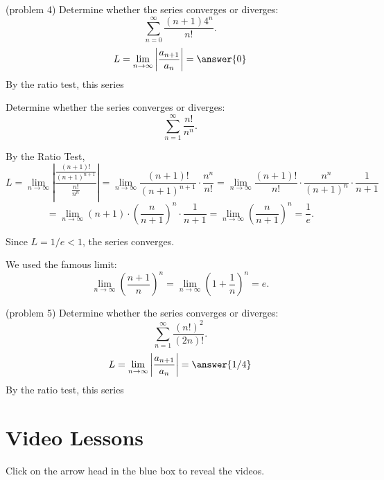 \documentclass[handout]{ximera}
\begin{document}
\begin{problem}(problem 4)
Determine whether the series converges or diverges:
\[
\sum_{n=0}^\infty \frac{(n+1)4^n}{n!}.
\]
\[
L = \lim_{n \to \infty} \left|\frac{a_{n+1}}{a_n}\right| = \answer{0}
\]
By the ratio test, this series 

\end{problem}






\begin{example}[example 5]
Determine whether the series converges or diverges:
\[
\sum_{n=1}^\infty \frac{n!}{n^n}.
\]


By the Ratio Test,
\[
L =  \lim_{n \to \infty} \left|\frac{\frac{(n+1)!}{(n+1)^{n+1}}}{\frac{n!}{n^n}}\right| = 
\lim_{n \to \infty} \frac{(n+1)!}{(n+1)^{n+1}}\cdot \frac{n^n}{n!}
=  \lim_{n \to \infty} \frac{(n+1)!}{n!} \cdot  \frac{n^n}{(n+1)^n}\cdot \frac{1}{n+1}
\]
\[
= \lim_{n \to \infty} (n+1) \cdot \left(\frac{n}{n+1}\right)^n \cdot \frac{1}{n+1} = \lim_{n \to \infty} \left(\frac{n}{n+1}\right)^n = \frac{1}{e}.
\]


Since $L = 1/e < 1$, the series converges.

\begin{remark}
We used the famous limit:
\[
\lim_{n \to \infty} \left(\frac{n+1}{n}\right)^n = \lim_{n \to \infty} \left(1 + \frac{1}{n}\right)^n = e.
\]
\end{remark}


\end{example}



\begin{problem}(problem 5)
Determine whether the series converges or diverges:
\[
\sum_{n=1}^\infty \frac{(n!)^2}{(2n)!}.
\]
\[
L = \lim_{n \to \infty} \left|\frac{a_{n+1}}{a_n}\right| = \answer{1/4}
\]
By the ratio test, this series 

\end{problem}




\section{Video Lessons}

Click on the arrow head in the blue box to reveal the videos.\\
\end{document}

